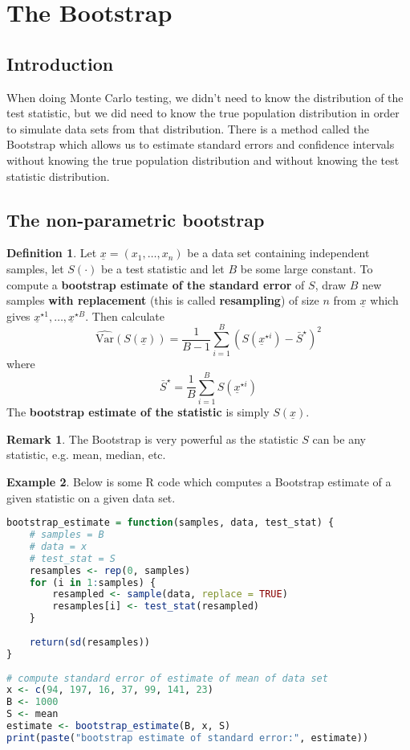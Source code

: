 \documentclass[12pt,a4paper]{article}
\theoremstyle{definition}
\newtheorem{definition}{Definition}[subsection]
\newtheorem{example}[definition]{Example}
\newtheorem*{remark}{Remark}
\begin{document}
\section{The Bootstrap}

\subsection{Introduction}

When doing Monte Carlo testing, we didn't need to know the distribution of the test statistic, but we did need to know the true population distribution in order to simulate data sets from that distribution. There is a method called the Bootstrap which allows us to estimate standard errors and confidence intervals without knowing the true population distribution and without knowing the test statistic distribution.

\subsection{The non-parametric bootstrap}

\begin{definition}
	Let $\underline{x} = (x_1, \dots, x_n)$ be a data set containing independent samples, let $S(\cdot)$ be a test statistic and let $B$ be some large constant. To compute a \textbf{bootstrap estimate of the standard error} of $S$, draw $B$ new samples \textbf{with replacement} (this is called \textbf{resampling}) of size $n$ from $\underline{x}$ which gives $\underline{x}^{\star 1}, \dots, \underline{x}^{\star B}$. Then calculate
	\[
		\widehat{\text{Var}}(S(\underline{x})) = \frac{1}{B - 1} \sum_{i = 1}^B {\left( S(\underline{x}^{\star i}) - \bar{S}^{\star} \right)}^2 
	\]
	where
	\[
		\bar{S}^{\star} = \frac{1}{B} \sum_{i = 1}^B S \left( \underline{x}^{\star i} \right)
	\]
	The \textbf{bootstrap estimate of the statistic} is simply $S(\underline{x})$.
\end{definition}

\begin{remark}
	The Bootstrap is very powerful as the statistic $S$ can be any statistic, e.g. mean, median, etc.
\end{remark}

\begin{example}
	Below is some R code which computes a Bootstrap estimate of a given statistic on a given data set.

	\begin{lstlisting}[language=R]
bootstrap_estimate = function(samples, data, test_stat) {
	# samples = B
	# data = x
	# test_stat = S
	resamples <- rep(0, samples)
	for (i in 1:samples) {
		resampled <- sample(data, replace = TRUE)
		resamples[i] <- test_stat(resampled)
	}
	
	return(sd(resamples))
}
		  
# compute standard error of estimate of mean of data set
x <- c(94, 197, 16, 37, 99, 141, 23)
B <- 1000
S <- mean
estimate <- bootstrap_estimate(B, x, S)
print(paste("bootstrap estimate of standard error:", estimate))
	\end{lstlisting}
\end{example}
\end{document}

